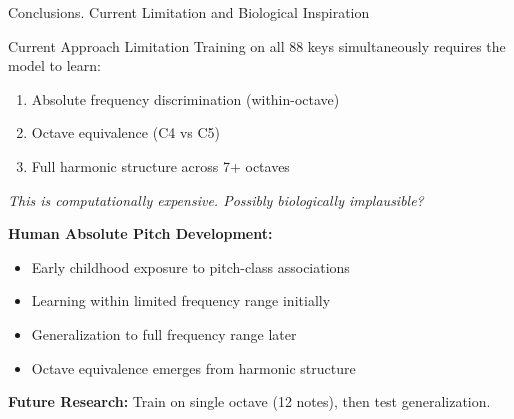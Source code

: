 \documentclass[aspectratio=169,20pt]{beamer}
\begin{document}
\begin{frame}{Conclusions. Current Limitation and Biological Inspiration}
\begin{block}{Current Approach Limitation}
Training on all 88 keys simultaneously requires the model to learn:\
\begin{enumerate}
    \item Absolute frequency discrimination (within-octave)
    \item Octave equivalence (C4 vs C5)
    \item Full harmonic structure across 7+ octaves
\end{enumerate}
\textit{This is computationally expensive. Possibly biologically implausible?}
\end{block}

\vspace{0.1cm}
\textbf{Human Absolute Pitch Development:}
\begin{itemize}
    \item Early childhood exposure to pitch-class associations
    \item Learning within limited frequency range initially
    \item Generalization to full frequency range later
    \item Octave equivalence emerges from harmonic structure
\end{itemize}

\vspace{0.1cm}
\textbf{Future Research:} Train on single octave (12 notes), then test generalization.
\end{frame}
\end{document}
